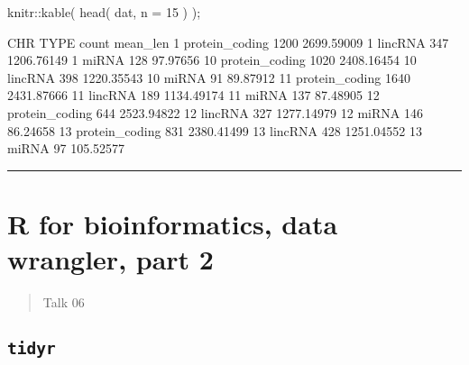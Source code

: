 \documentclass[
]{article}
\newenvironment{Shaded}{}{}
\newcommand{\AttributeTok}[1]{\textcolor[rgb]{0.49,0.56,0.16}{#1}}
\newcommand{\DecValTok}[1]{\textcolor[rgb]{0.25,0.63,0.44}{#1}}
\newcommand{\FloatTok}[1]{\textcolor[rgb]{0.25,0.63,0.44}{#1}}
\newcommand{\FunctionTok}[1]{\textcolor[rgb]{0.02,0.16,0.49}{#1}}
\newcommand{\NormalTok}[1]{#1}
\newcommand{\SpecialCharTok}[1]{\textcolor[rgb]{0.25,0.44,0.63}{#1}}
\begin{document}
\begin{Shaded}
\begin{Highlighting}[]
\NormalTok{knitr}\SpecialCharTok{::}\FunctionTok{kable}\NormalTok{( }\FunctionTok{head}\NormalTok{( dat, }\AttributeTok{n =} \DecValTok{15}\NormalTok{ ) );}

\NormalTok{CHR	TYPE	          count	mean\_len}
\DecValTok{1}\NormalTok{	  protein\_coding	}\DecValTok{1200}	\FloatTok{2699.59009}
\DecValTok{1}\NormalTok{	  lincRNA	        }\DecValTok{347}	  \FloatTok{1206.76149}
\DecValTok{1}\NormalTok{	  miRNA	          }\DecValTok{128}	  \FloatTok{97.97656}
\DecValTok{10}\NormalTok{	protein\_coding	}\DecValTok{1020}	\FloatTok{2408.16454}
\DecValTok{10}\NormalTok{	lincRNA	        }\DecValTok{398}  	\FloatTok{1220.35543}
\DecValTok{10}\NormalTok{	miRNA	          }\DecValTok{91}	  \FloatTok{89.87912}
\DecValTok{11}\NormalTok{	protein\_coding	}\DecValTok{1640}	\FloatTok{2431.87666}
\DecValTok{11}\NormalTok{	lincRNA	        }\DecValTok{189} 	\FloatTok{1134.49174}
\DecValTok{11}\NormalTok{	miRNA	          }\DecValTok{137}	  \FloatTok{87.48905}
\DecValTok{12}\NormalTok{	protein\_coding	}\DecValTok{644}	  \FloatTok{2523.94822}
\DecValTok{12}\NormalTok{	lincRNA	        }\DecValTok{327}	  \FloatTok{1277.14979}
\DecValTok{12}\NormalTok{	miRNA	          }\DecValTok{146}	  \FloatTok{86.24658}
\DecValTok{13}\NormalTok{	protein\_coding	}\DecValTok{831}	  \FloatTok{2380.41499}
\DecValTok{13}\NormalTok{	lincRNA	        }\DecValTok{428}	  \FloatTok{1251.04552}
\DecValTok{13}\NormalTok{	miRNA	          }\DecValTok{97}	  \FloatTok{105.52577}
\end{Highlighting}
\end{Shaded}

\begin{center}\rule{0.5\linewidth}{0.5pt}\end{center}

\newpage
\hypertarget{r-for-bioinformatics-data-wrangler-part-2}{%
\section{R for bioinformatics, data wrangler, part
2}\label{r-for-bioinformatics-data-wrangler-part-2}}

\begin{quote}
Talk 06
\end{quote}

\hypertarget{tidyr}{%
\subsection{\texorpdfstring{\texttt{tidyr}}{tidyr}}\label{tidyr}}
\end{document}
